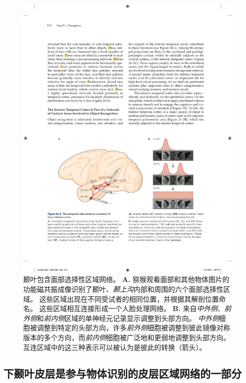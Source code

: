 \begin{figure}[htbp]
	\centering
	\includegraphics[width=1.0\linewidth]{chap24/fig_24_6}
	\caption{颞叶包含面部选择性区域网络。
		\textbf{A.} 猕猴观看面部和其他物体图片的功能磁共振成像识别了颞叶、\textit{颞上沟}内部和周围的六个面部选择性区域。
		这些区域出现在不同受试者的相同位置，并根据其解剖位置命名。
		这些区域相互连接形成一个人脸处理网络。
		\textbf{B.} 来自\textit{中外侧}、\textit{前外侧}和\textit{前内侧}区域的单神经元记录显示调整到头部方向。
		\textit{中外侧}细胞被调整到特定的头部方向，许多\textit{前外侧}细胞被调整到彼此镜像对称版本的多个方向，而\textit{前内侧}细胞被广泛地和更弱地调整到头部方向。
		互连区域中的这三种表示可以被认为是彼此的转换（箭头）。}
	\label{fig:24_6}
\end{figure}



\subsection{下颞叶皮层是参与物体识别的皮层区域网络的一部分}

